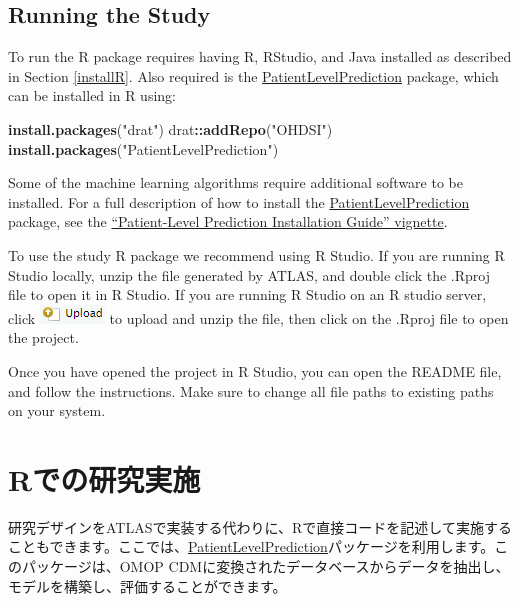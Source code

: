 \documentclass[
  11pt]{book}
\newenvironment{Shaded}{\begin{snugshade}}{\end{snugshade}}
\newcommand{\FunctionTok}[1]{\textcolor[rgb]{0.13,0.29,0.53}{\textbf{#1}}}
\newcommand{\NormalTok}[1]{#1}
\newcommand{\SpecialCharTok}[1]{\textcolor[rgb]{0.81,0.36,0.00}{\textbf{#1}}}
\newcommand{\StringTok}[1]{\textcolor[rgb]{0.31,0.60,0.02}{#1}}
\theoremstyle{definition}
\theoremstyle{definition}
\theoremstyle{definition}
\theoremstyle{definition}
\theoremstyle{remark}
\begin{document}
\subsection{Running the Study}\label{running-the-study}

To run the R package requires having R, RStudio, and Java installed as described in Section \ref{installR}. Also required is the \href{https://ohdsi.github.io/PatientLevelPrediction/}{PatientLevelPrediction} package, which can be installed in R using:

\begin{Shaded}
\begin{Highlighting}[]
\FunctionTok{install.packages}\NormalTok{(}\StringTok{"drat"}\NormalTok{)}
\NormalTok{drat}\SpecialCharTok{::}\FunctionTok{addRepo}\NormalTok{(}\StringTok{"OHDSI"}\NormalTok{)}
\FunctionTok{install.packages}\NormalTok{(}\StringTok{"PatientLevelPrediction"}\NormalTok{)}
\end{Highlighting}
\end{Shaded}

Some of the machine learning algorithms require additional software to be installed. For a full description of how to install the \href{https://ohdsi.github.io/PatientLevelPrediction/}{PatientLevelPrediction} package, see the \href{https://ohdsi.github.io/PatientLevelPrediction/articles/InstallationGuide.html}{``Patient-Level Prediction Installation Guide'' vignette}.

To use the study R package we recommend using R Studio. If you are running R Studio locally, unzip the file generated by ATLAS, and double click the .Rproj file to open it in R Studio. If you are running R Studio on an R studio server, click \includegraphics{images/PopulationLevelEstimation/upload.png} to upload and unzip the file, then click on the .Rproj file to open the project.

Once you have opened the project in R Studio, you can open the README file, and follow the instructions. Make sure to change all file paths to existing paths on your system.

\section{Rでの研究実施}\label{rux3067ux306eux7814ux7a76ux5b9fux65bd}

研究デザインをATLASで実装する代わりに、Rで直接コードを記述して実施することもできます。ここでは、\href{https://ohdsi.github.io/PatientLevelPrediction/}{PatientLevelPrediction}パッケージを利用します。このパッケージは、OMOP CDMに変換されたデータベースからデータを抽出し、モデルを構築し、評価することができます。
\end{document}

